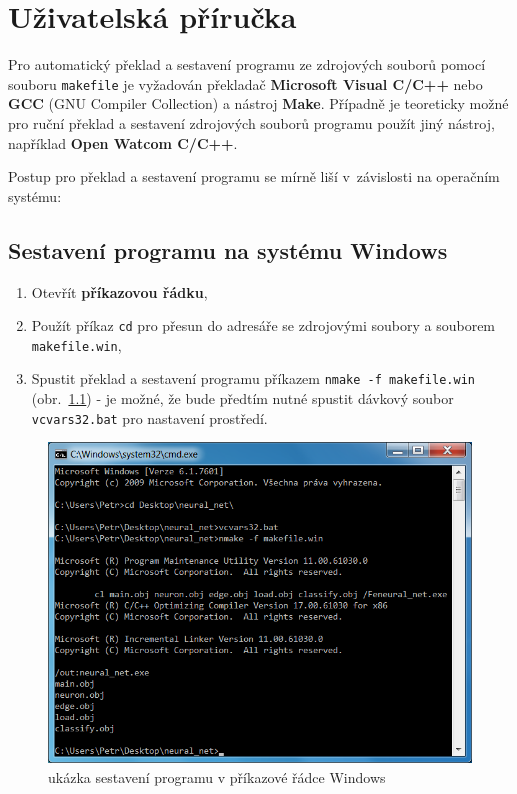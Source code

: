\documentclass[12pt, a4paper, titlepage]{report}
\begin{document}
\newpage

\chapter{Uživatelská příručka}
Pro automatický překlad a sestavení programu ze zdrojových souborů pomocí souboru \texttt{makefile} je vyžadován překladač \textbf{Microsoft Visual C/C++} nebo \textbf{GCC} (GNU Compiler Collection) a nástroj \textbf{Make}. Případně je teoreticky možné pro ruční překlad a sestavení zdrojových souborů programu použít jiný nástroj, například \textbf{Open Watcom C/C++}.\\
\par\noindent
Postup pro překlad a sestavení programu se mírně liší v~závislosti na operačním systému:
\section{Sestavení programu na systému Windows}
\begin{enumerate}
\item Otevřít \textbf{příkazovou řádku},
\item Použít příkaz \texttt{cd} pro přesun do adresáře se zdrojovými soubory a souborem \texttt{makefile.win},
\item Spustit překlad a sestavení programu příkazem \texttt{nmake -f makefile.win} (obr.~\ref{fig:cmd}) - je možné, že bude předtím nutné spustit dávkový soubor \texttt{vcvars32.bat} pro nastavení prostředí.
\end{enumerate}
\begin{figure}[htbp]
    \centering
    \includegraphics[width=12cm]{img/cmd.png}
    \caption{ukázka sestavení programu v příkazové řádce Windows}
    \label{fig:cmd}
\end{figure}
\end{document}
